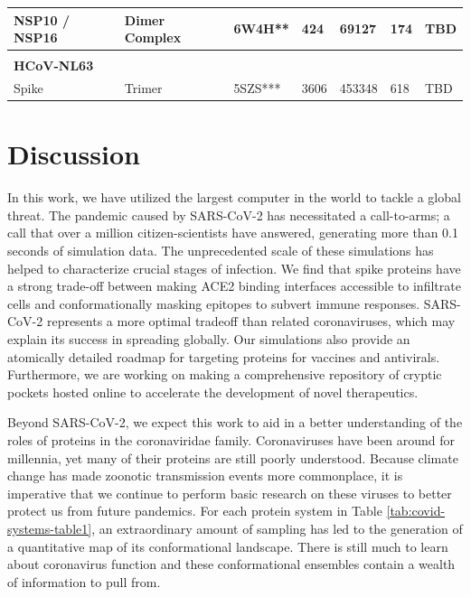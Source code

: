 \documentclass[../main.tex]{subfiles}
\begin{document}
\begin{table}[]
{\begin{tabular}{|l|l|p{2.5cm}|l|l|l|p{2.5cm}|}
                NSP10 / NSP16                     & Dimer Complex  & 6W4H**  & 424  & 69127  & 174    & TBD \\ \hline
                                                  &                &         &      &        &        &     \\ \hline
                \textbf{HCoV-NL63}                &                &         &      &        &        &     \\ \hline
                Spike                             & Trimer         & 5SZS*** & 3606 & 453348 & 618    & TBD \\ \hline
                \end{tabular}}
        \end{table}

    \section{Discussion}
        In this work, we have utilized the largest computer in the world to tackle a global threat. The pandemic caused by SARS-CoV-2 has necessitated a call-to-arms; a call that over a million citizen-scientists have answered, generating more than 0.1 seconds of simulation data. The unprecedented scale of these simulations has helped to characterize crucial stages of infection. We find that spike proteins have a strong trade-off between making ACE2 binding interfaces accessible to infiltrate cells and conformationally masking epitopes to subvert immune responses. SARS-CoV-2 represents a more optimal tradeoff than related coronaviruses, which may explain its success in spreading globally. Our simulations also provide an atomically detailed roadmap for targeting proteins for vaccines and antivirals. Furthermore, we are working on making a comprehensive repository of cryptic pockets hosted online to accelerate the development of novel therapeutics.
    
        Beyond SARS-CoV-2, we expect this work to aid in a better understanding of the roles of proteins in the coronaviridae family. Coronaviruses have been around for millennia, yet many of their proteins are still poorly understood. Because climate change has made zoonotic transmission events more commonplace, it is imperative that we continue to perform basic research on these viruses to better protect us from future pandemics. For each protein system in Table \ref{tab:covid-systems-table1}, an extraordinary amount of sampling has led to the generation of a quantitative map of its conformational landscape. There is still much to learn about coronavirus function and these conformational ensembles contain a wealth of information to pull from.
    
\end{document}
